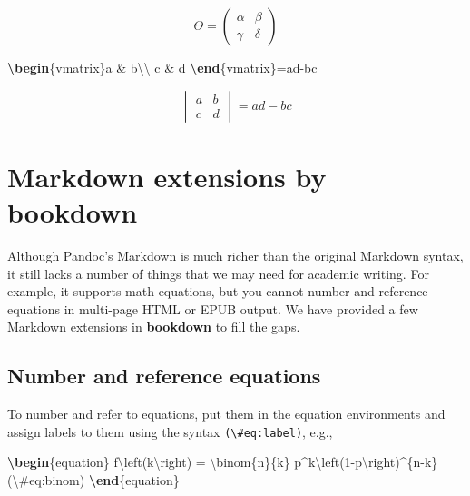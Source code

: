 \documentclass[
  12pt,
]{krantz}
\newenvironment{Shaded}{\begin{snugshade}}{\end{snugshade}}
\newcommand{\ExtensionTok}[1]{#1}
\newcommand{\KeywordTok}[1]{\textcolor[rgb]{0.13,0.29,0.53}{\textbf{#1}}}
\newcommand{\NormalTok}[1]{#1}
\newcommand{\SpecialCharTok}[1]{\textcolor[rgb]{0.00,0.00,0.00}{#1}}
\newcommand{\SpecialStringTok}[1]{\textcolor[rgb]{0.31,0.60,0.02}{#1}}
\theoremstyle{definition}
\theoremstyle{definition}
\theoremstyle{definition}
\theoremstyle{definition}
\theoremstyle{remark}
\begin{document}
\[\Theta = \begin{pmatrix}\alpha & \beta\\
\gamma & \delta
\end{pmatrix}\]

\begin{Shaded}
\begin{Highlighting}[]
\SpecialStringTok{$$}\KeywordTok{\textbackslash{}begin}\NormalTok{\{}\ExtensionTok{vmatrix}\NormalTok{\}}\SpecialStringTok{a \& b}\SpecialCharTok{\textbackslash{}\textbackslash{}}
\SpecialStringTok{c \& d}
\KeywordTok{\textbackslash{}end}\NormalTok{\{}\ExtensionTok{vmatrix}\NormalTok{\}}\SpecialStringTok{=ad{-}bc$$}
\end{Highlighting}
\end{Shaded}

\[\begin{vmatrix}a & b\\
c & d
\end{vmatrix}=ad-bc\]

\hypertarget{markdown-extensions-by-bookdown}{%
\section{Markdown extensions by bookdown}\label{markdown-extensions-by-bookdown}}

Although Pandoc's Markdown is much richer than the original Markdown syntax, it still lacks a number of things that we may need for academic writing. For example, it supports math equations, but you cannot number and reference equations in multi-page HTML or EPUB output. We have provided a few Markdown extensions in \textbf{bookdown} to fill the gaps.

\hypertarget{equations}{%
\subsection{Number and reference equations}\label{equations}}

To number and refer to equations, put them in the equation environments and assign labels to them using the syntax \texttt{(\textbackslash{}\#eq:label)}, e.g.,

\begin{Shaded}
\begin{Highlighting}[]
\KeywordTok{\textbackslash{}begin}\NormalTok{\{}\ExtensionTok{equation}\NormalTok{\}}\SpecialStringTok{ }
\SpecialStringTok{  f}\SpecialCharTok{\textbackslash{}left}\SpecialStringTok{(k}\SpecialCharTok{\textbackslash{}right}\SpecialStringTok{) = }\SpecialCharTok{\textbackslash{}binom}\SpecialStringTok{\{n\}\{k\} p\^{}k}\SpecialCharTok{\textbackslash{}left}\SpecialStringTok{(1{-}p}\SpecialCharTok{\textbackslash{}right}\SpecialStringTok{)\^{}\{n{-}k\}}
\SpecialStringTok{  (}\SpecialCharTok{\textbackslash{}\#}\SpecialStringTok{eq:binom)}
\KeywordTok{\textbackslash{}end}\NormalTok{\{}\ExtensionTok{equation}\NormalTok{\} }
\end{Highlighting}
\end{Shaded}
\end{document}
